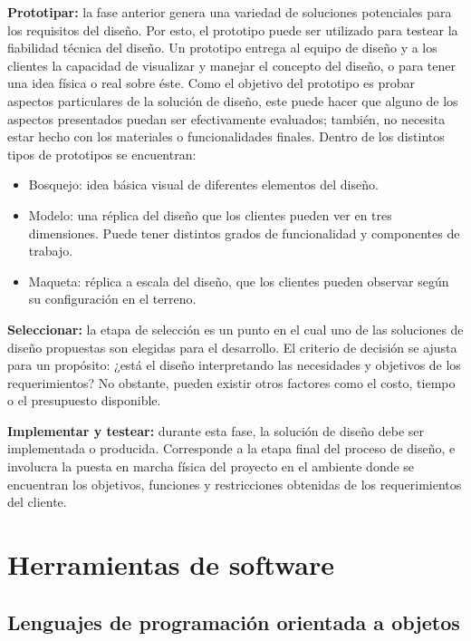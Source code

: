 \begin{description}
\item \textbf{Prototipar:} la fase anterior genera una variedad de soluciones potenciales para los requisitos del diseño. Por esto, el prototipo puede ser utilizado para testear la fiabilidad técnica del diseño. Un prototipo entrega al equipo de diseño y a los clientes la capacidad de visualizar y manejar el concepto del diseño, o para tener una idea física o real sobre éste. Como el objetivo del prototipo es probar aspectos particulares de la solución de diseño, este puede hacer que alguno de los aspectos presentados puedan ser efectivamente evaluados; también, no necesita estar hecho con los materiales o funcionalidades finales. Dentro de los distintos tipos de prototipos se encuentran:
\begin{itemize}
\item Bosquejo: idea básica visual de diferentes elementos del diseño.
\item Modelo: una réplica del diseño que los clientes pueden ver en tres dimensiones. Puede
 tener distintos grados de funcionalidad y componentes de trabajo.
 \item Maqueta: réplica a escala del diseño, que los clientes pueden observar según su configuración en el terreno.
\end{itemize}

\item \textbf{Seleccionar:} la etapa de selección es un punto en el cual uno de las soluciones de diseño propuestas son elegidas para el desarrollo. El criterio de decisión se ajusta para un propósito: ¿está el diseño interpretando las necesidades y objetivos de los requerimientos? No obstante, pueden existir otros factores como el costo, tiempo o el presupuesto disponible.

\item \textbf{Implementar y testear:} durante esta fase, la solución de diseño debe ser implementada o producida. Corresponde a la etapa final del proceso de diseño, e involucra la puesta en marcha física del proyecto en el ambiente donde se encuentran los objetivos, funciones y restricciones obtenidas de los requerimientos del cliente. 

\end{description}


\section{Herramientas de software}

\subsection{Lenguajes de programación orientada a objetos}


